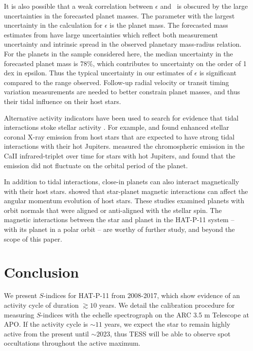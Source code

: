 It is also possible that a weak correlation between $\epsilon$ and \rprime\ is obscured by the large uncertainties in the forecasted planet masses. The parameter with the largest uncertainty in the calculation for $\epsilon$ is the planet mass. The forecasted mass estimates from \citet{Chen2017} have large uncertainties which reflect both measurement uncertainty and intrinsic spread in the observed planetary mass-radius relation. For the planets in the sample considered here, the median uncertainty in the forecasted planet mass is 78\%, which contributes to uncertainty on the order of 1 dex in epsilon. Thus the typical uncertainty in our estimates of $\epsilon$ is significant compared to the range observed. Follow-up radial velocity or transit timing variation measurements are needed to better constrain planet masses, and thus their tidal influence on their host stars.

Alternative activity indicators have been used to search for evidence that tidal interactions stoke stellar activity \citep[see reviews by][]{wright2015, poppenhaeger2017}. For example, \citet{Poppenhaeger2014} and \citet{miller2015} found enhanced stellar coronal X-ray emission from host stars that are expected to have strong tidal interactions with their hot Jupiters. \citet{saar2001} measured the chromospheric emission in the CaII infrared-triplet over time for stars with hot Jupiters, and found that the emission did not fluctuate on the orbital period of the planet.

In addition to tidal interactions, close-in planets can also interact magnetically with their host stars. \citet{Cohen2010, Lanza2010} showed that star-planet magnetic interactions can affect the angular momentum evolution of host stars. These studies examined planets with orbit normals that were aligned or anti-aligned with the stellar spin. The magnetic interactions between the star and planet in the HAT-P-11 system -- with its planet in a polar orbit -- are worthy of further study, and beyond the scope of this paper.

\section{Conclusion}

We present $S$-indices for HAT-P-11 from 2008-2017, which show evidence of an activity cycle of duration $\gtrsim 10$ years. We detail the calibration procedure for measuring $S$-indices with the echelle spectrograph on the ARC 3.5 m Telescope at APO. If the activity cycle is $\sim 11$ years, we expect the star to remain highly active from the present until $\sim 2023$, thus TESS will be able to observe spot occultations throughout the active maximum.

